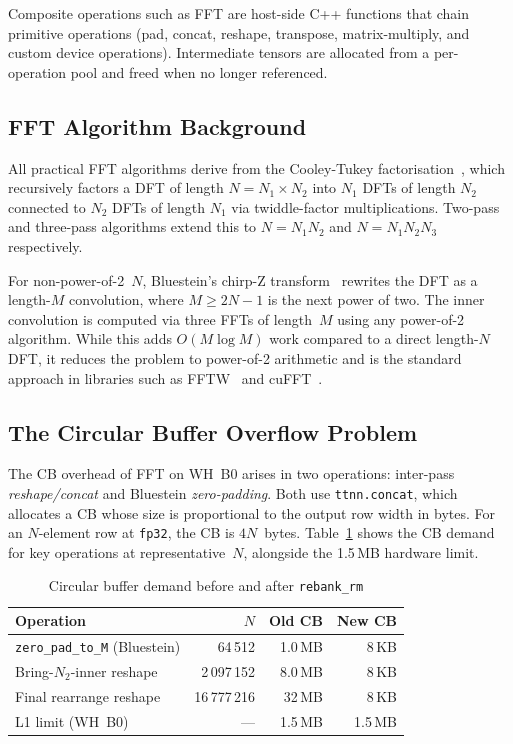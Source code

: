 \documentclass[conference]{IEEEtran}
\begin{document}
Composite operations such as FFT are host-side C++ functions that chain
primitive operations (pad, concat, reshape, transpose, matrix-multiply, and
custom device operations). Intermediate tensors are allocated from a
per-operation pool and freed when no longer referenced.

\subsection{FFT Algorithm Background}

All practical FFT algorithms derive from the Cooley-Tukey
factorisation~\cite{cooley1965}, which recursively factors a DFT of length
$N = N_1 \times N_2$ into $N_1$ DFTs of length $N_2$ connected to $N_2$ DFTs
of length $N_1$ via twiddle-factor multiplications. Two-pass and three-pass
algorithms extend this to $N = N_1 N_2$ and $N = N_1 N_2 N_3$ respectively.

For non-power-of-2~$N$, Bluestein's chirp-Z
transform~\cite{bluestein1970} rewrites the DFT as a length-$M$ convolution,
where $M \geq 2N - 1$ is the next power of two. The inner convolution is
computed via three FFTs of length~$M$ using any power-of-2 algorithm. While
this adds $O(M \log M)$ work compared to a direct length-$N$ DFT, it reduces
the problem to power-of-2 arithmetic and is the standard approach in libraries
such as FFTW~\cite{fftw2005} and cuFFT~\cite{cufft}.

\subsection{The Circular Buffer Overflow Problem}

The CB overhead of FFT on WH~B0 arises in two operations: inter-pass
\textit{reshape/concat} and Bluestein \textit{zero-padding}. Both use
\texttt{ttnn.concat}, which allocates a CB whose size is proportional to the
output row width in bytes. For an $N$-element row at \texttt{fp32}, the CB is
$4N$~bytes. Table~\ref{tab:overflow} shows the CB demand for key operations at
representative~$N$, alongside the 1.5\,MB hardware limit.

\begin{table}[t]
  \caption{Circular buffer demand before and after \texttt{rebank\_rm}}
  \label{tab:overflow}
  \centering
  \begin{tabular}{lrrr}
    \toprule
    Operation & $N$ & Old CB & New CB \\
    \midrule
    \texttt{zero\_pad\_to\_M} (Bluestein) & 64\,512  & 1.0\,MB & 8\,KB \\
    Bring-$N_2$-inner reshape             & 2\,097\,152 & 8.0\,MB & 8\,KB \\
    Final rearrange reshape               & 16\,777\,216 & 32\,MB & 8\,KB \\
    \midrule
    L1 limit (WH~B0)                      & ---      & 1.5\,MB & 1.5\,MB \\
    \bottomrule
  \end{tabular}
\end{table}
\end{document}
